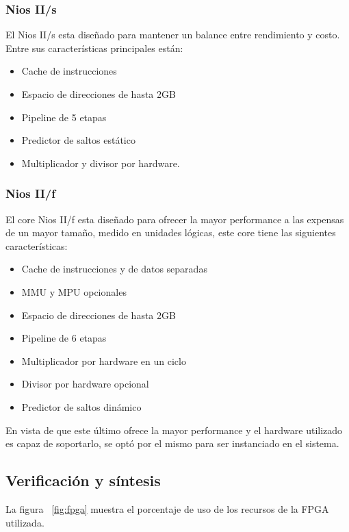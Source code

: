 \subsubsection{Nios II/s}
El Nios II/s esta diseñado para mantener un balance entre rendimiento y costo. Entre sus características principales están:

\begin{itemize}
	\item Cache de instrucciones
	\item Espacio de direcciones de hasta 2GB
	\item Pipeline de 5 etapas
	\item Predictor de saltos estático
	\item Multiplicador y divisor por hardware. 
\end{itemize}

\subsubsection{Nios II/f}
El core Nios II/f esta diseñado para ofrecer la mayor performance a las expensas de un mayor tamaño, medido en unidades lógicas, este core tiene las siguientes características:

\begin{itemize}
	\item Cache de instrucciones y de datos separadas
	\item MMU y MPU opcionales
	\item Espacio de direcciones de hasta 2GB
	\item Pipeline de 6 etapas
	\item Multiplicador por hardware en un ciclo
	\item Divisor por hardware opcional
	\item Predictor de saltos dinámico
\end{itemize}

En vista de que este último ofrece la mayor performance y el hardware utilizado es capaz de soportarlo, se optó por el mismo para ser instanciado en el sistema.


\subsection{Verificación y síntesis}

La figura ~\ref{fig:fpga} muestra el porcentaje de uso de los recursos de la FPGA utilizada.

